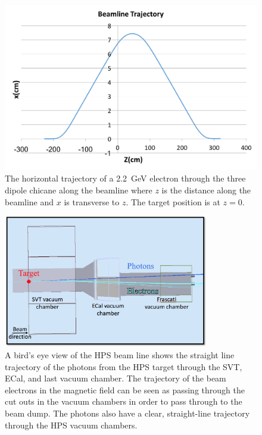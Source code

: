 \begin{figure}[htb]
  \centering
      \includegraphics[width=1.0\textwidth]{pics/experiment/feetrajectory.png}
  \caption[Charged particle trajectory in HPS beamline]{The horizontal trajectory of a 2.2~GeV electron through the three dipole chicane along the beamline where $z$ is the distance along the beamline and $x$ is transverse to $z$. The target position is at $z=0$.}
  \label{Figure:trajectory}
\end{figure}

\begin{figure}[htb]
  \centering
      \includegraphics[width=0.8\textwidth]{pics/experiment/hpsbeam_v2.png}
  \caption[HPS beamline simulation in GEMC]{A bird's eye view of the HPS beam line shows the straight line trajectory of the photons from the HPS target through the SVT, ECal, and last vacuum chamber. The trajectory of the beam electrons in the magnetic field can be seen as passing through the cut outs in the vacuum chambers in order to pass through to the beam dump. The photons also have a clear, straight-line trajectory through the HPS vacuum chambers.}
  \label{Figure:gemc}
\end{figure}

